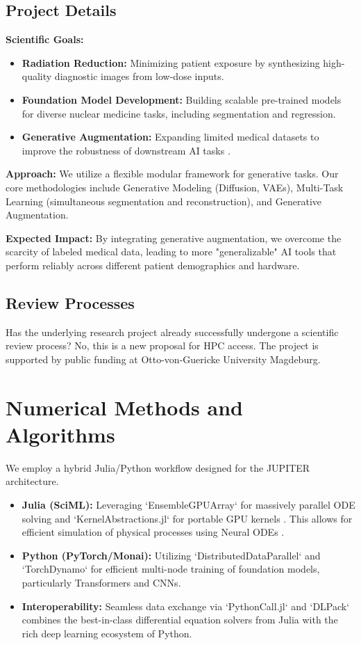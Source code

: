 \documentclass[11pt,a4paper]{article}
\begin{document}
\subsection{Project Details}
\textbf{Scientific Goals:}
\begin{itemize}
    \item \textbf{Radiation Reduction:} Minimizing patient exposure by synthesizing high-quality diagnostic images from low-dose inputs.
    \item \textbf{Foundation Model Development:} Building scalable pre-trained models for diverse nuclear medicine tasks, including segmentation and regression.
    \item \textbf{Generative Augmentation:} Expanding limited medical datasets to improve the robustness of downstream AI tasks \cite{GoodfellowShlens2014}.
\end{itemize}

\textbf{Approach:}
We utilize a flexible modular framework for generative tasks. Our core methodologies include Generative Modeling (Diffusion, VAEs), Multi-Task Learning (simultaneous segmentation and reconstruction), and Generative Augmentation.

\textbf{Expected Impact:}
By integrating generative augmentation, we overcome the scarcity of labeled medical data, leading to more "generalizable" AI tools that perform reliably across different patient demographics and hardware.

\subsection{Review Processes}
Has the underlying research project already successfully undergone a scientific review process?
No, this is a new proposal for HPC access. The project is supported by public funding at Otto-von-Guericke University Magdeburg.

\section{Numerical Methods and Algorithms}
\label{sec:methods}
We employ a hybrid Julia/Python workflow designed for the JUPITER architecture.
\begin{itemize}
    \item \textbf{Julia (SciML):} Leveraging `EnsembleGPUArray` for massively parallel ODE solving and `KernelAbstractions.jl` for portable GPU kernels \cite{Li2023}. This allows for efficient simulation of physical processes using Neural ODEs \cite{ChenLiu2024}.
    \item \textbf{Python (PyTorch/Monai):} Utilizing `DistributedDataParallel` and `TorchDynamo` for efficient multi-node training of foundation models, particularly Transformers and CNNs.
    \item \textbf{Interoperability:} Seamless data exchange via `PythonCall.jl` and `DLPack` combines the best-in-class differential equation solvers from Julia with the rich deep learning ecosystem of Python.
\end{itemize}
\end{document}
